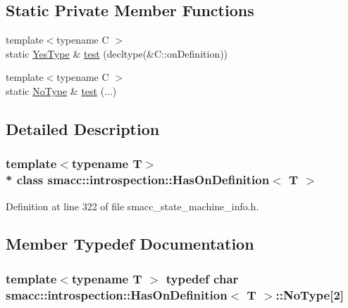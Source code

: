 \subsection*{Static Private Member Functions}
\begin{DoxyCompactItemize}
\item 
{\footnotesize template$<$typename C $>$ }\\static \hyperlink{classsmacc_1_1introspection_1_1HasOnDefinition_ad18cda8f47c5a0e9660b7c7ca54d98c7}{Yes\+Type} \& \hyperlink{classsmacc_1_1introspection_1_1HasOnDefinition_a67765fe6ab28cd7062f75b6456d760e5}{test} (decltype(\&C\+::on\+Definition))
\item 
{\footnotesize template$<$typename C $>$ }\\static \hyperlink{classsmacc_1_1introspection_1_1HasOnDefinition_ab6416d52a925d6a0ce9204897191692e}{No\+Type} \& \hyperlink{classsmacc_1_1introspection_1_1HasOnDefinition_a22cbbab4a5ce8f1b85cfd98a374f7f49}{test} (...)
\end{DoxyCompactItemize}


\subsection{Detailed Description}
\subsubsection*{template$<$typename T$>$\\*
class smacc\+::introspection\+::\+Has\+On\+Definition$<$ T $>$}



Definition at line 322 of file smacc\+\_\+state\+\_\+machine\+\_\+info.\+h.



\subsection{Member Typedef Documentation}
\subsubsection[{\texorpdfstring{No\+Type}{NoType}}]{\setlength{\rightskip}{0pt plus 5cm}template$<$typename T $>$ typedef char {\bf smacc\+::introspection\+::\+Has\+On\+Definition}$<$ T $>$\+::No\+Type\mbox{[}2\mbox{]}\hspace{0.3cm}{\ttfamily [private]}}\hypertarget{classsmacc_1_1introspection_1_1HasOnDefinition_ab6416d52a925d6a0ce9204897191692e}{}\label{classsmacc_1_1introspection_1_1HasOnDefinition_ab6416d52a925d6a0ce9204897191692e}


